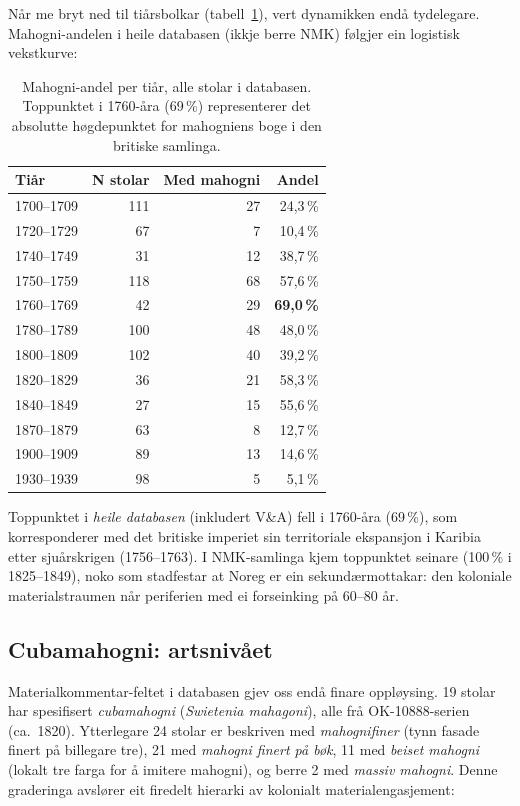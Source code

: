 \documentclass[10pt, a4paper, twocolumn]{article}
\begin{document}
Når me bryt ned til tiårsbolkar (tabell~\ref{tab:decade}), vert dynamikken endå tydelegare. Mahogni-andelen i heile databasen (ikkje berre NMK) følgjer ein logistisk vekstkurve:

\begin{table}[H]
\centering
\caption{Mahogni-andel per tiår, alle stolar i databasen. Toppunktet i 1760-åra (69\,\%) representerer det absolutte høgdepunktet for mahogniens boge i den britiske samlinga.}
\label{tab:decade}
\begin{tabular}{@{}lrrr@{}}
\toprule
\textbf{Tiår} & \textbf{N stolar} & \textbf{Med mahogni} & \textbf{Andel} \\
\midrule
1700--1709 & 111 & 27 & 24,3\,\% \\
1720--1729 &  67 &  7 & 10,4\,\% \\
1740--1749 &  31 & 12 & 38,7\,\% \\
1750--1759 & 118 & 68 & 57,6\,\% \\
1760--1769 &  42 & 29 & \textbf{69,0\,\%} \\
1780--1789 & 100 & 48 & 48,0\,\% \\
1800--1809 & 102 & 40 & 39,2\,\% \\
1820--1829 &  36 & 21 & 58,3\,\% \\
1840--1849 &  27 & 15 & 55,6\,\% \\
1870--1879 &  63 &  8 & 12,7\,\% \\
1900--1909 &  89 & 13 & 14,6\,\% \\
1930--1939 &  98 &  5 &  5,1\,\% \\
\bottomrule
\end{tabular}
\end{table}

Toppunktet i \emph{heile databasen} (inkludert V\&A) fell i 1760-åra (69\,\%), som korresponderer med det britiske imperiet sin territoriale ekspansjon i Karibia etter sjuårskrigen (1756--1763). I NMK-samlinga kjem toppunktet seinare (100\,\% i 1825--1849), noko som stadfestar at Noreg er ein sekundærmottakar: den koloniale materialstraumen når periferien med ei forseinking på 60--80 år.

\subsection{Cubamahogni: artsnivået}

Materialkommentar-feltet i databasen gjev oss endå finare oppløysing. 19 stolar har spesifisert \emph{cubamahogni} (\emph{Swietenia mahagoni}), alle frå OK-10888-serien (ca.\ 1820). Ytterlegare 24 stolar er beskriven med \emph{mahognifiner} (tynn fasade finert på billegare tre), 21 med \emph{mahogni finert på bøk}, 11 med \emph{beiset mahogni} (lokalt tre farga for å imitere mahogni), og berre 2 med \emph{massiv mahogni}. Denne graderinga avslører eit firedelt hierarki av kolonialt materialengasjement:
\end{document}
